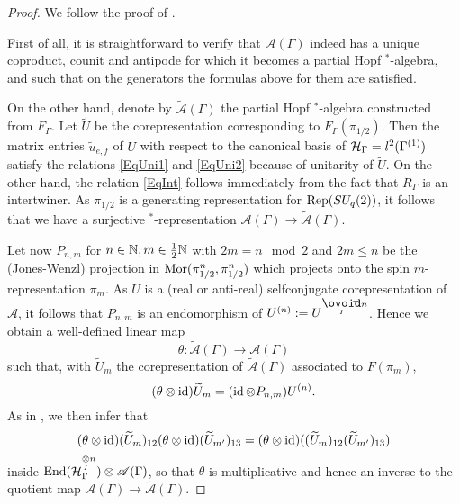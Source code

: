 \begin{proof} We follow the proof of \cite[Theorem 5.5]{BDV1}.

First of all, it is straightforward to verify that $\mathscr{A}(\Gamma)$ indeed has a unique coproduct, counit and antipode for which it becomes a partial Hopf $^*$-algebra, and such that on the generators the formulas above for them are satisfied.%

On the other hand, denote by $\widetilde{\mathscr{A}}(\Gamma)$ the partial Hopf $^*$-algebra constructed from $F_{\Gamma}$. Let $\widetilde{U}$ be the corepresentation corresponding to $F_{\Gamma}(\pi_{1/2})$. Then the matrix entries $\widetilde{u}_{e,f}$ of $\widetilde{U}$ with respect to  the canonical basis of $\mathcal{H}_{\Gamma} = l^2(\Gamma^{(1)})$ satisfy the relations \eqref{EqUni1} and \eqref{EqUni2} because of unitarity of $\widetilde{U}$. On the other hand, the relation \eqref{EqInt} follows immediately from the fact that $R_{\Gamma}$ is an intertwiner. As $\pi_{1/2}$ is a generating representation for $\mathrm{Rep}(SU_q(2))$, it follows that we have a surjective $^*$-representation $\mathscr{A}(\Gamma)\rightarrow \widetilde{\mathscr{A}}(\Gamma)$.

Let now $P_{n,m}$ for $n\in \mathbb{N},m\in \frac{1}{2}\mathbb{N}$ with $2m = n \mod 2$ and $2m\leq n$ be the (Jones-Wenzl) projection in $\mathrm{Mor}(\pi_{1/2}^{n},\pi_{1/2}^{n})$ which projects onto the spin $m$-representation $\pi_m$. As $U$ is a (real or anti-real) selfconjugate corepresentation of $\mathscr{A}$, it follows that $P_{n,m}$ is an endomorphism of $U^{(n)} := U^{\Circt n}$. Hence we obtain a well-defined linear map \[\theta: \widetilde{\mathscr{A}}(\Gamma)\rightarrow \mathscr{A}(\Gamma)\] such that, with $\widetilde{U}_m$ the corepresentation of $\widetilde{\mathscr{A}}(\Gamma)$ associated to $F(\pi_m)$,  \[ (\theta\otimes \operatorname{id})\widetilde{U}_m = (\operatorname{id}\otimes P_{n,m})U^{(n)}.\]
As in \cite{BDV1}, we then infer that \[(\theta\otimes\operatorname{id})(\widetilde{U}_m)_{12}(\theta\otimes\operatorname{id})(\widetilde{U}_{m'})_{13} = (\theta\otimes\operatorname{id})((\widetilde{U}_m)_{12}(\widetilde{U}_{m'})_{13})\] inside $\operatorname{\mathrm{End}}(\mathcal{H}_{\Gamma}^{\underset{I}{\otimes} n})\otimes \mathscr{A}(\Gamma)$, so that $\theta$ is multiplicative and hence an inverse to the quotient map  $\mathscr{A}(\Gamma)\rightarrow \widetilde{\mathscr{A}}(\Gamma)$.
\end{proof}



